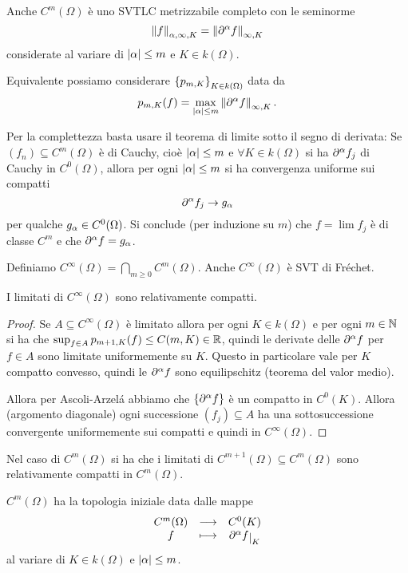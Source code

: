 \begin{remark}
Anche $C^m(\Omega)$ \`e uno SVTLC metrizzabile completo con le seminorme
\[\left\Vert{f}\right\Vert_{\alpha,\infty,K}=\left\Vert{\partial^\alpha f}\right\Vert_{\infty,K}\]
considerate al variare di $\left|{\alpha}\right|\leq m$ e $K\in k(\Omega)$.

Equivalente possiamo considerare $\left\{{p_{m,K}}\right\}_{K\in k(\Omega)}$ data da
\[p_{m,K}(f)=\max_{\left|{\alpha}\right|\leq m}\left\Vert{\partial^\alpha f}\right\Vert_{\infty,K}.\]

Per la complettezza basta usare il teorema di limite sotto il segno di derivata: Se $(f_n)\subseteq C^m(\Omega)$ \`e di Cauchy, cio\`e $\left|{\alpha}\right|\leq m$ e $\forall K\in k(\Omega)$ si ha $\partial^\alpha f_j$ di Cauchy in $C^0(\Omega)$, allora per ogni $\left|{\alpha}\right|\leq m$ si ha convergenza uniforme sui compatti
\[\partial^\alpha f_j\to g_\alpha\]
per qualche $g_\alpha\in C^0(\Omega)$. Si conclude (per induzione su $m$) che $f=\lim f_j$ \`e di classe $C^m$ e che $\partial^\alpha f=g_\alpha$.
\end{remark}

\begin{definition}
Definiamo $C^\infty(\Omega)=\bigcap_{m\geq 0}C^m(\Omega)$. Anche $C^\infty(\Omega)$ \`e SVT di Fr\'echet.
\end{definition}

\begin{remark}
I limitati di $C^\infty(\Omega)$ sono relativamente compatti.
\end{remark}
\begin{proof}
Se $A\subseteq C^\infty(\Omega)$ \`e limitato allora per ogni $K\in k(\Omega)$ e per ogni $m\in \mathbb{N}$ si ha che $\sup_{f\in A}p_{m+1,K}(f)\leq C(m,K)\in\mathbb{R}$, quindi le derivate delle $\partial^\alpha f$ per $f\in A$ sono limitate uniformemente su $K$. Questo in particolare vale per $K$ compatto convesso, quindi le $\partial^\alpha f$ sono equilipschitz (teorema del valor medio).

Allora per Ascoli-Arzel\'a abbiamo che $\left\{{\partial^\alpha f}\right\}$ \`e un compatto in $C^0(K)$. Allora (argomento diagonale) ogni successione $(f_j)\subseteq A$ ha una sottosuccessione convergente uniformemente sui compatti e quindi in $C^\infty(\Omega)$.
\end{proof}

\begin{remark}
Nel caso di $C^m(\Omega)$ si ha che i limitati di $C^{m+1}(\Omega)\subseteq C^m(\Omega)$ sono relativamente compatti in $C^m(\Omega)$.
\end{remark}

\begin{remark}
$C^m(\Omega)$ ha la topologia iniziale data dalle mappe
\[\funcDef{C^m(\Omega)}{C^0(K)}{f}{\del^\al f\res K}\]
al variare di $K\in k(\Omega)$ e $\left|{\alpha}\right|\leq m$.
\end{remark}

